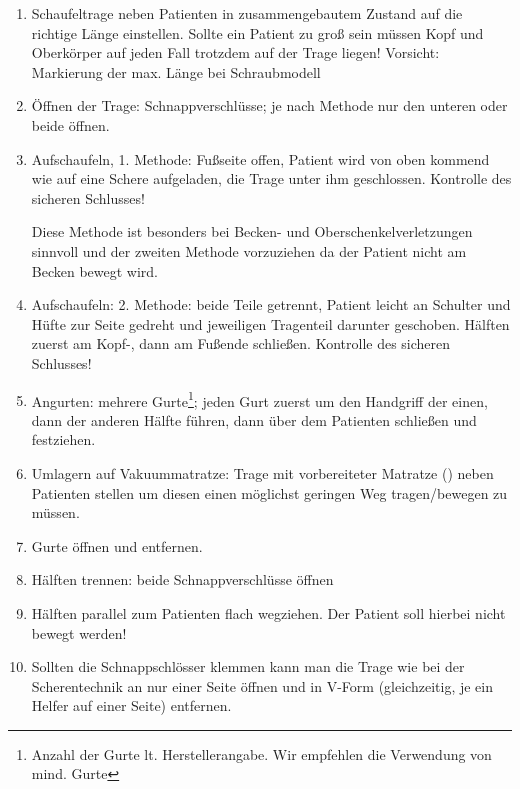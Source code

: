 \begin{enumerate}
    \item Schaufeltrage neben Patienten in zusammengebautem Zustand auf die
    richtige Länge einstellen. Sollte ein Patient zu groß sein
    müssen Kopf und Oberkörper auf jeden Fall trotzdem auf der Trage
    liegen! Vorsicht: Markierung der max. Länge bei Schraubmodell
    \item Öffnen der Trage: Schnappverschlüsse; je nach Methode nur den
    unteren oder beide öffnen.
    \item Aufschaufeln, 1. Methode: Fußseite offen, Patient wird von oben
    kommend wie auf eine Schere aufgeladen, die Trage unter ihm
    geschlossen. Kontrolle des sicheren Schlusses!
    
    Diese Methode ist besonders bei Becken- und Oberschenkelverletzungen
    sinnvoll und der zweiten Methode vorzuziehen da der Patient nicht am Becken
    bewegt wird.
    \item Aufschaufeln: 2. Methode: beide Teile getrennt, Patient leicht an
    Schulter und Hüfte zur Seite gedreht und jeweiligen Tragenteil
    darunter geschoben. Hälften zuerst am Kopf-, dann am Fußende
    schließen. Kontrolle des sicheren Schlusses!
    \item Angurten: mehrere Gurte\footnote{Anzahl der Gurte lt.
    Herstellerangabe. Wir empfehlen die Verwendung von mind.  Gurte};
    jeden Gurt zuerst um den Handgriff der einen, dann der anderen Hälfte
    führen,  dann über dem Patienten schließen und festziehen.
    \item Umlagern auf Vakuummatratze: Trage mit vorbereiteter Matratze
    () neben Patienten stellen um diesen
    einen möglichst geringen Weg tragen/bewegen zu müssen.
    \item Gurte öffnen und entfernen.
    \item Hälften trennen: beide Schnappverschlüsse öffnen
    \item Hälften parallel zum Patienten flach wegziehen. Der Patient soll
    hierbei nicht bewegt werden!
    \item Sollten die Schnappschlösser klemmen kann man die Trage wie bei
    der Scherentechnik an nur einer Seite öffnen und in V-Form (gleichzeitig, je
    ein Helfer auf einer Seite) entfernen.
\end{enumerate}

